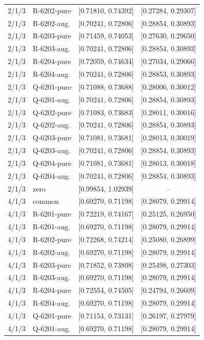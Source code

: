 {\begin{longtable}{rlcc}
2/1/3 & R-6202-pure & [0.71810, 0.74392] & [0.27284, 0.29307] \\
2/1/3 & R-6202-aug. & [0.70241, 0.72806] & [0.28854, 0.30893] \\
2/1/3 & R-6203-pure & [0.71459, 0.74053] & [0.27630, 0.29650] \\
2/1/3 & R-6203-aug. & [0.70241, 0.72806] & [0.28854, 0.30893] \\
2/1/3 & R-6204-pure & [0.72059, 0.74634] & [0.27034, 0.29066] \\
2/1/3 & R-6204-aug. & [0.70241, 0.72806] & [0.28853, 0.30893] \\
2/1/3 & Q-6201-pure & [0.71088, 0.73688] & [0.28006, 0.30012] \\
2/1/3 & Q-6201-aug. & [0.70241, 0.72806] & [0.28854, 0.30893] \\
2/1/3 & Q-6202-pure & [0.71083, 0.73683] & [0.28011, 0.30016] \\
2/1/3 & Q-6202-aug. & [0.70241, 0.72806] & [0.28854, 0.30893] \\
2/1/3 & Q-6203-pure & [0.71081, 0.73681] & [0.28013, 0.30019] \\
2/1/3 & Q-6203-aug. & [0.70241, 0.72806] & [0.28854, 0.30893] \\
2/1/3 & Q-6204-pure & [0.71081, 0.73681] & [0.28013, 0.30018] \\
2/1/3 & Q-6204-aug. & [0.70241, 0.72806] & [0.28854, 0.30893] \\
2/1/3 & zero & [0.99854, 1.02939] & -- \\
4/1/3 & common & [0.69270, 0.71198] & [0.28079, 0.29914] \\
4/1/3 & R-6201-pure & [0.72219, 0.74167] & [0.25125, 0.26950] \\
4/1/3 & R-6201-aug. & [0.69270, 0.71198] & [0.28079, 0.29914] \\
4/1/3 & R-6202-pure & [0.72268, 0.74214] & [0.25080, 0.26899] \\
4/1/3 & R-6202-aug. & [0.69270, 0.71198] & [0.28079, 0.29914] \\
4/1/3 & R-6203-pure & [0.71852, 0.73808] & [0.25498, 0.27303] \\
4/1/3 & R-6203-aug. & [0.69270, 0.71198] & [0.28079, 0.29914] \\
4/1/3 & R-6204-pure & [0.72554, 0.74505] & [0.24794, 0.26609] \\
4/1/3 & R-6204-aug. & [0.69270, 0.71198] & [0.28079, 0.29914] \\
4/1/3 & Q-6201-pure & [0.71154, 0.73131] & [0.26197, 0.27979] \\
4/1/3 & Q-6201-aug. & [0.69270, 0.71198] & [0.28079, 0.29914] \\

\end{longtable}}
